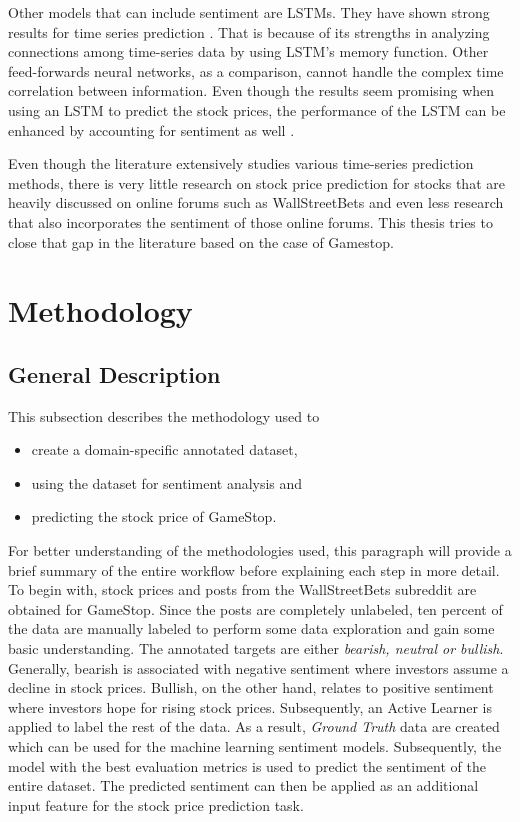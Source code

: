 \documentclass[11pt, a4paper]{article}
\begin{document}
Other models that can include sentiment are LSTMs. They have shown strong results for time series prediction \citep{rammurthy2021lstm}. That is because of its strengths in 
analyzing connections among time-series data by using LSTM's memory function. Other feed-forwards neural networks, as a comparison, cannot handle the complex 
time correlation between information. Even though the results seem promising when using an LSTM to predict the stock prices, the performance of the LSTM 
can be enhanced by accounting for sentiment as well \citep{jin2020lstmsentiment, wang2019forecasting}.

Even though the literature extensively studies various time-series prediction methods, there is very little research on stock price prediction for stocks that are heavily discussed on
online forums such as WallStreetBets and even less research that also incorporates the sentiment of those online forums. This thesis tries to close that gap in the literature based
on the case of Gamestop.



\section{Methodology}

\subsection{General Description}

This subsection describes the methodology used to 
\begin{itemize}
    \item create a domain-specific annotated dataset, 
    \item using the dataset for sentiment analysis and
    \item predicting the stock price of GameStop.
\end{itemize}

For better understanding of the methodologies used, this paragraph will provide a brief summary of the entire workflow before explaining each step in more detail.
To begin with, stock prices and posts from the WallStreetBets subreddit are obtained for GameStop. Since the posts are completely
unlabeled, ten percent of the data are manually labeled to perform some data exploration and gain some basic understanding.
The annotated targets are either \emph{bearish, neutral or bullish}. Generally, bearish is associated with negative 
sentiment where investors assume a decline in stock prices. Bullish, on the other hand, relates to positive sentiment where investors hope for rising stock prices.
Subsequently, an Active Learner is applied to label the rest of the data. As a result, \emph{Ground Truth} data are created which can be used
for the machine learning sentiment models. Subsequently, the model with the best evaluation metrics is used to predict the sentiment of the entire
dataset. The predicted sentiment can then be applied as an additional input feature for the stock price prediction task.
\end{document}

